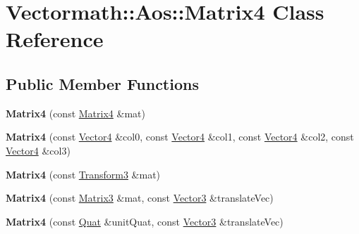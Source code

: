 \hypertarget{class_vectormath_1_1_aos_1_1_matrix4}{\section{Vectormath\+:\+:Aos\+:\+:Matrix4 Class Reference}
\label{class_vectormath_1_1_aos_1_1_matrix4}
}
\subsection*{Public Member Functions}
\begin{DoxyCompactItemize}
\item 
\hypertarget{class_vectormath_1_1_aos_1_1_matrix4_ab1f5a51a2e0d533dd04e1645e9f1f9de}{{\bfseries Matrix4} (const \hyperlink{class_vectormath_1_1_aos_1_1_matrix4}{Matrix4} \&mat)}\label{class_vectormath_1_1_aos_1_1_matrix4_ab1f5a51a2e0d533dd04e1645e9f1f9de}

\item 
\hypertarget{class_vectormath_1_1_aos_1_1_matrix4_af3386f64d6e060f56a9cc5597d634f83}{{\bfseries Matrix4} (const \hyperlink{class_vectormath_1_1_aos_1_1_vector4}{Vector4} \&col0, const \hyperlink{class_vectormath_1_1_aos_1_1_vector4}{Vector4} \&col1, const \hyperlink{class_vectormath_1_1_aos_1_1_vector4}{Vector4} \&col2, const \hyperlink{class_vectormath_1_1_aos_1_1_vector4}{Vector4} \&col3)}\label{class_vectormath_1_1_aos_1_1_matrix4_af3386f64d6e060f56a9cc5597d634f83}

\item 
\hypertarget{class_vectormath_1_1_aos_1_1_matrix4_a155dbd37559971bfcd30124bf5b66b5b}{{\bfseries Matrix4} (const \hyperlink{class_vectormath_1_1_aos_1_1_transform3}{Transform3} \&mat)}\label{class_vectormath_1_1_aos_1_1_matrix4_a155dbd37559971bfcd30124bf5b66b5b}

\item 
\hypertarget{class_vectormath_1_1_aos_1_1_matrix4_a136146577c4e69585bde9e17fd7739fd}{{\bfseries Matrix4} (const \hyperlink{class_vectormath_1_1_aos_1_1_matrix3}{Matrix3} \&mat, const \hyperlink{class_vectormath_1_1_aos_1_1_vector3}{Vector3} \&translate\+Vec)}\label{class_vectormath_1_1_aos_1_1_matrix4_a136146577c4e69585bde9e17fd7739fd}

\item 
\hypertarget{class_vectormath_1_1_aos_1_1_matrix4_ac3baa078bb8fc98ffc65cc32c36c5e6e}{{\bfseries Matrix4} (const \hyperlink{class_vectormath_1_1_aos_1_1_quat}{Quat} \&unit\+Quat, const \hyperlink{class_vectormath_1_1_aos_1_1_vector3}{Vector3} \&translate\+Vec)}\label{class_vectormath_1_1_aos_1_1_matrix4_ac3baa078bb8fc98ffc65cc32c36c5e6e}


\end{DoxyCompactItemize}
